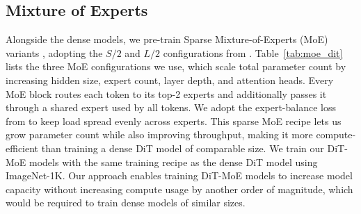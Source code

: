\documentclass[manuscript,screen,review]{acmart}
\begin{document}
\subsection{Mixture of Experts}
Alongside the dense models, we pre-train Sparse Mixture-of-Experts (MoE) variants \citep{shazeer2017outrageously}, adopting the $S/2$
and $L/2$ configurations from \citep{fei2024scalingb}. Table~\ref{tab:moe_dit} lists the three MoE configurations we use,
which scale total parameter count by increasing hidden size, expert count, layer depth, and attention
heads. Every MoE block routes each token to its top-2 experts and additionally passes it through a
shared expert used by all tokens. We adopt the expert-balance loss
from \citep{fei2024scalingb} to keep load spread evenly across experts. This sparse
MoE recipe lets us grow parameter count while also improving throughput, making it more
compute-efficient than training a dense DiT model of comparable size. We train our DiT-MoE models
with the same training recipe as the dense DiT model using ImageNet-1K. Our approach enables
training DiT-MoE models to increase model capacity without increasing compute usage by another
order of magnitude, which would be required to train dense models of similar sizes.
\end{document}
